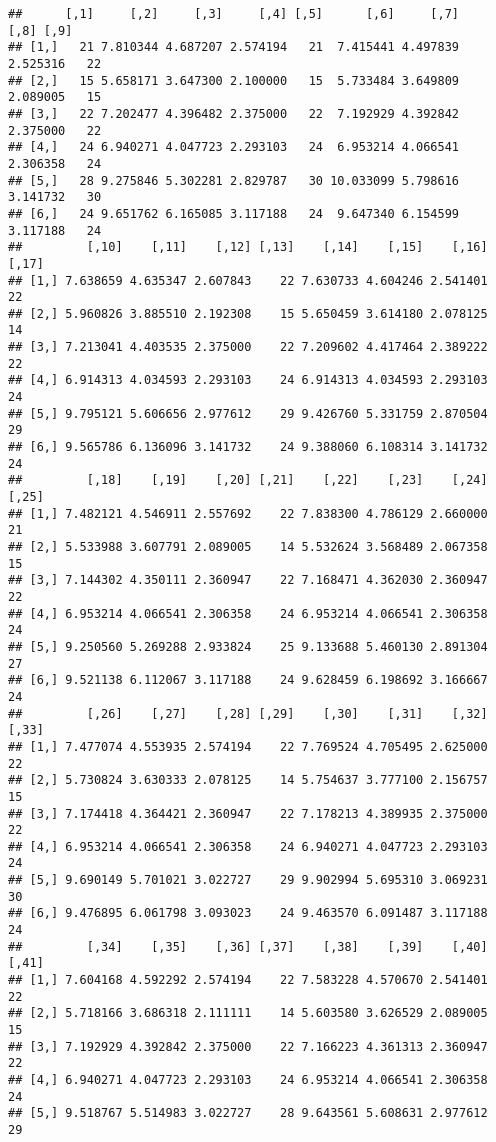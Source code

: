 \documentclass[]{article}
\begin{document}
\begin{verbatim}
##      [,1]     [,2]     [,3]     [,4] [,5]      [,6]     [,7]     [,8] [,9]
## [1,]   21 7.810344 4.687207 2.574194   21  7.415441 4.497839 2.525316   22
## [2,]   15 5.658171 3.647300 2.100000   15  5.733484 3.649809 2.089005   15
## [3,]   22 7.202477 4.396482 2.375000   22  7.192929 4.392842 2.375000   22
## [4,]   24 6.940271 4.047723 2.293103   24  6.953214 4.066541 2.306358   24
## [5,]   28 9.275846 5.302281 2.829787   30 10.033099 5.798616 3.141732   30
## [6,]   24 9.651762 6.165085 3.117188   24  9.647340 6.154599 3.117188   24
##         [,10]    [,11]    [,12] [,13]    [,14]    [,15]    [,16] [,17]
## [1,] 7.638659 4.635347 2.607843    22 7.630733 4.604246 2.541401    22
## [2,] 5.960826 3.885510 2.192308    15 5.650459 3.614180 2.078125    14
## [3,] 7.213041 4.403535 2.375000    22 7.209602 4.417464 2.389222    22
## [4,] 6.914313 4.034593 2.293103    24 6.914313 4.034593 2.293103    24
## [5,] 9.795121 5.606656 2.977612    29 9.426760 5.331759 2.870504    29
## [6,] 9.565786 6.136096 3.141732    24 9.388060 6.108314 3.141732    24
##         [,18]    [,19]    [,20] [,21]    [,22]    [,23]    [,24] [,25]
## [1,] 7.482121 4.546911 2.557692    22 7.838300 4.786129 2.660000    21
## [2,] 5.533988 3.607791 2.089005    14 5.532624 3.568489 2.067358    15
## [3,] 7.144302 4.350111 2.360947    22 7.168471 4.362030 2.360947    22
## [4,] 6.953214 4.066541 2.306358    24 6.953214 4.066541 2.306358    24
## [5,] 9.250560 5.269288 2.933824    25 9.133688 5.460130 2.891304    27
## [6,] 9.521138 6.112067 3.117188    24 9.628459 6.198692 3.166667    24
##         [,26]    [,27]    [,28] [,29]    [,30]    [,31]    [,32] [,33]
## [1,] 7.477074 4.553935 2.574194    22 7.769524 4.705495 2.625000    22
## [2,] 5.730824 3.630333 2.078125    14 5.754637 3.777100 2.156757    15
## [3,] 7.174418 4.364421 2.360947    22 7.178213 4.389935 2.375000    22
## [4,] 6.953214 4.066541 2.306358    24 6.940271 4.047723 2.293103    24
## [5,] 9.690149 5.701021 3.022727    29 9.902994 5.695310 3.069231    30
## [6,] 9.476895 6.061798 3.093023    24 9.463570 6.091487 3.117188    24
##         [,34]    [,35]    [,36] [,37]    [,38]    [,39]    [,40] [,41]
## [1,] 7.604168 4.592292 2.574194    22 7.583228 4.570670 2.541401    22
## [2,] 5.718166 3.686318 2.111111    14 5.603580 3.626529 2.089005    15
## [3,] 7.192929 4.392842 2.375000    22 7.166223 4.361313 2.360947    22
## [4,] 6.940271 4.047723 2.293103    24 6.953214 4.066541 2.306358    24
## [5,] 9.518767 5.514983 3.022727    28 9.643561 5.608631 2.977612    29

\end{verbatim}
\end{document}
